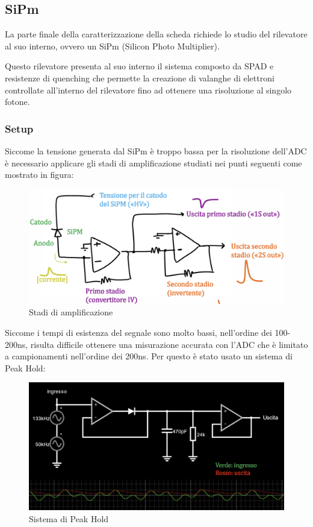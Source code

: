 \pagebreak
\subsection{SiPm}
La parte finale della caratterizzazione della scheda richiede lo studio del rilevatore al suo interno, ovvero un SiPm (Silicon Photo Multiplier).

Questo rilevatore presenta al suo interno il sistema composto da SPAD e resistenze di quenching che permette la creazione di valanghe di elettroni controllate all'interno del rilevatore fino ad ottenere una risoluzione al singolo fotone.

\subsubsection{Setup}

Siccome la tensione generata dal SiPm è troppo bassa per la risoluzione dell'ADC è necessario applicare gli stadi di amplificazione studiati nei punti seguenti come mostrato in figura:

\begin{figure}[!h]
    \centering
    \includegraphics[width=0.5\linewidth]{analog/assets/SiPm/SiPm_Stadi_Amp.png}
    \caption{Stadi di amplificazione}
    \label{fig:SiPm stadi di amp}
\end{figure}

Siccome i tempi di esistenza del segnale sono molto bassi, nell'ordine dei 100-200ns, risulta difficile ottenere una misurazione accurata con l'ADC che è limitato a campionamenti nell'ordine dei 200ns. Per questo è stato usato un sistema di Peak Hold:

\begin{figure}[!h]
    \centering
    \includegraphics[width=0.5\linewidth]{analog/assets/SiPm/SiPm_Peak_hold.png}
    \caption{Sistema di Peak Hold}
\end{figure}

